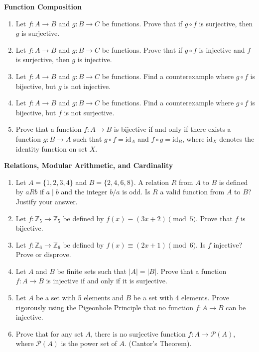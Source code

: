 \documentclass[11pt, letterpaper]{article}
\theoremstyle{definition}
\theoremstyle{remark}
\newcommand{\Z}{\mathbb{Z}}
\begin{document}
\textbf{Function Composition}

\begin{enumerate}[label=\textbf{\arabic*.}, resume]
    \item Let $f : A \to B$ and $g : B \to C$ be functions. Prove that if $g \circ f$ is surjective, then $g$ is surjective.
    \item Let $f : A \to B$ and $g : B \to C$ be functions. Prove that if $g \circ f$ is injective and $f$ is surjective, then $g$ is injective.
    \item Let $f : A \to B$ and $g : B \to C$ be functions. Find a counterexample where $g \circ f$ is bijective, but $g$ is not injective.
    \item Let $f : A \to B$ and $g : B \to C$ be functions. Find a counterexample where $g \circ f$ is bijective, but $f$ is not surjective.
    \item Prove that a function $f : A \to B$ is bijective if and only if there exists a function $g : B \to A$ such that $g \circ f = \text{id}_A$ and $f \circ g = \text{id}_B$, where $\text{id}_X$ denotes the identity function on set $X$.
\end{enumerate}

\textbf{Relations, Modular Arithmetic, and Cardinality}

\begin{enumerate}[label=\textbf{\arabic*.}, resume]
    \item Let $A = \{1, 2, 3, 4\}$ and $B = \{2, 4, 6, 8\}$. A relation $R$ from $A$ to $B$ is defined by $aRb$ if $a \mid b$ and the integer $b/a$ is odd. Is $R$ a valid function from $A$ to $B$? Justify your answer.
    \item Let $f : \Z_5 \to \Z_5$ be defined by $f(x) \equiv (3x + 2) \pmod 5$. Prove that $f$ is bijective.
    \item Let $f : \Z_6 \to \Z_6$ be defined by $f(x) \equiv (2x + 1) \pmod 6$. Is $f$ injective? Prove or disprove.
    \item Let $A$ and $B$ be finite sets such that $|A| = |B|$. Prove that a function $f : A \to B$ is injective if and only if it is surjective.
    \item Let $A$ be a set with 5 elements and $B$ be a set with 4 elements. Prove rigorously using the Pigeonhole Principle that no function $f : A \to B$ can be injective.
    \item Prove that for any set $A$, there is no surjective function $f : A \to \mathcal{P}(A)$, where $\mathcal{P}(A)$ is the power set of $A$. (Cantor's Theorem).
\end{enumerate}
\end{document}
